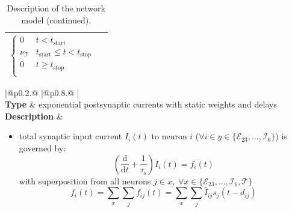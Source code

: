 \documentclass[10pt,a4paper,twoside,american]{article}
\theoremstyle{definitionstyle}
\newcommand{\diff}{\ensuremath{\text{d}}}
\newcommand{\tauS}{\tau_\text{s}}
\begin{document}
\begin{table}[H]
\begin{tabular}{
  |@{\hspace*{\marg}}p{}@{\hspace*{\marg}}
  |@{\hspace*{\marg}}p{}@{\hspace*{\marg}}
  |}
\begin{equation}
    \begin{cases}
      0 & t<t_\text{start}\\
       \nu_{\mathcal{T}} & t_\text{start} \le t < t_\text{stop}\\
      0 & t\ge{}t_\text{stop}\\
    \end{cases}
  \end{equation}\\
  \hline
\end{tabular}
\caption{Description of the network model (continued).}
\label{tab:model_description_2}
\end{table}
\clearpage
\begin{table}[H]
\begin{tabular}{
  |@{\hspace*{\marg}}p{}@{\hspace*{\marg}}
  |@{\hspace*{\marg}}p{}@{\hspace*{\marg}}
  |}
  \hline 
  \\
  \hline 
  \textbf{Type} & exponential postsynaptic currents with static weights and delays \\
  \hline 
  \textbf{Description} &
  \begin{itemize}
	\item total synaptic input current $I_i(t)$ to neuron $i$ ($\forall i \in y\in\{\mathcal{E}_{23},\ldots,\mathcal{I}_{6}\}$) is governed by:
		\begin{equation}
			\label{eq:synaptic_current}
			\left(\frac{\diff}{\diff t} + \frac{1}{\tauS}\right) I_{i} (t) = f_{i}(t)
		\end{equation}
		with superposition from all neurons $j \in x,\;\forall x\in\{\mathcal{E}_{23},\ldots,\mathcal{I}_{6}, \mathcal{T}\}$
		\begin{equation}
			f_{i} (t) = \sum_{x} \sum_{j} f_{ij} (t) = \sum_{x} \sum_{j} \hat{I}_{ij} s_{j}(t-d_{ij})
		\end{equation}

\end{itemize}
\end{tabular}
\end{table}
\end{document}
